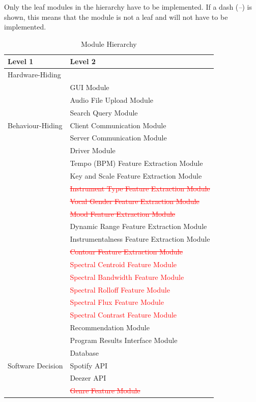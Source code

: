 \documentclass[12pt, titlepage]{article}
\begin{document}
Only the leaf modules in the hierarchy have to be implemented. If a dash
(\emph{--}) is shown, this means that the module is not a leaf and will not have
to be implemented.

\begin{table}[h!]
  \centering
  \begin{tabular}{p{} p{}}
  \toprule
  \textbf{Level 1} & \textbf{Level 2}\\
  \midrule
  
  {Hardware-Hiding} & ~ \\
  \midrule
  
  \multirow{7}{0.3\textwidth}{Behaviour-Hiding} & GUI Module\\
  & Audio File Upload Module\\
  & Search Query Module\\
  & Client Communication Module\\
  & Server Communication Module\\
  & Driver Module\\
  & Tempo (BPM) Feature Extraction Module\\
  & Key and Scale Feature Extraction Module\\
  & \textcolor{red}{\st{Instrument Type Feature Extraction Module}}\\
  & \textcolor{red}{\st{Vocal Gender Feature Extraction Module}}\\
  & \textcolor{red}{\st{Mood Feature Extraction Module}}\\
  & Dynamic Range Feature Extraction Module\\
  & Instrumentalness Feature Extraction Module\\
  & \textcolor{red}{\st{Contour Feature Extraction Module}}\\
  & \textcolor{red}{Spectral Centroid Feature Module}\\
  & \textcolor{red}{Spectral Bandwidth Feature Module}\\
  & \textcolor{red}{Spectral Rolloff Feature Module}\\
  & \textcolor{red}{Spectral Flux Feature Module}\\
  & \textcolor{red}{Spectral Contrast Feature Module}\\
  & Recommendation Module\\
  & Program Results Interface Module\\
  \midrule
  
  \multirow{3}{0.3\textwidth}{Software Decision} & Database\\
  & Spotify API\\
  & Deezer API\\
  & \textcolor{red}{\st{Genre Feature Module}}\\
  \bottomrule
  
  \end{tabular}
  \caption{Module Hierarchy}
  \label{TblMH}
  \end{table}
\end{document}
